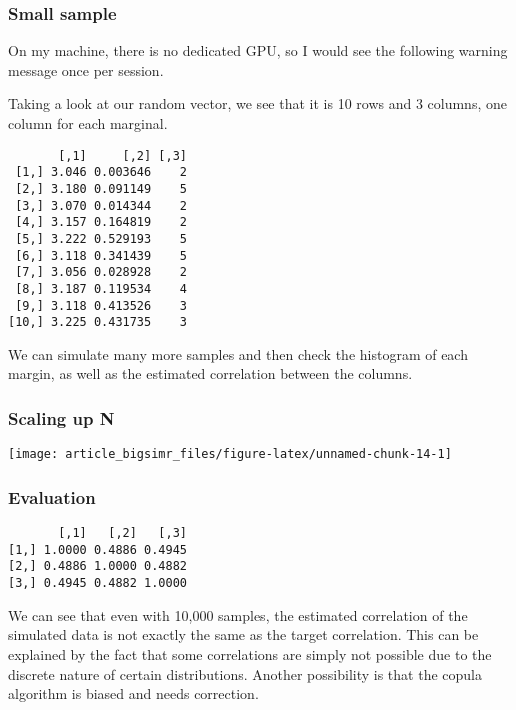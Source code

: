 \documentclass[
]{article}
\begin{document}
\hypertarget{small-sample}{%
\subsubsection{Small sample}\label{small-sample}}

On my machine, there is no dedicated GPU, so I would see the following warning message once per session.

Taking a look at our random vector, we see that it is 10 rows and 3 columns, one column for each marginal.

\begin{verbatim}
       [,1]     [,2] [,3]
 [1,] 3.046 0.003646    2
 [2,] 3.180 0.091149    5
 [3,] 3.070 0.014344    2
 [4,] 3.157 0.164819    2
 [5,] 3.222 0.529193    5
 [6,] 3.118 0.341439    5
 [7,] 3.056 0.028928    2
 [8,] 3.187 0.119534    4
 [9,] 3.118 0.413526    3
[10,] 3.225 0.431735    3
\end{verbatim}

We can simulate many more samples and then check the histogram of each margin, as well as the estimated correlation between the columns.

\hypertarget{scaling-up-n}{%
\subsubsection{Scaling up N}\label{scaling-up-n}}

\begin{center}\texttt{[image: article\_bigsimr\_files/figure-latex/unnamed-chunk-14-1]} \end{center}

\hypertarget{evaluation}{%
\subsubsection{Evaluation}\label{evaluation}}

\begin{verbatim}
       [,1]   [,2]   [,3]
[1,] 1.0000 0.4886 0.4945
[2,] 0.4886 1.0000 0.4882
[3,] 0.4945 0.4882 1.0000
\end{verbatim}

We can see that even with 10,000 samples, the estimated correlation of the simulated data is not exactly the same as the target correlation. This can be explained by the fact that some correlations are simply not possible due to the discrete nature of certain distributions. Another possibility is that the copula algorithm is biased and needs correction.
\end{document}
